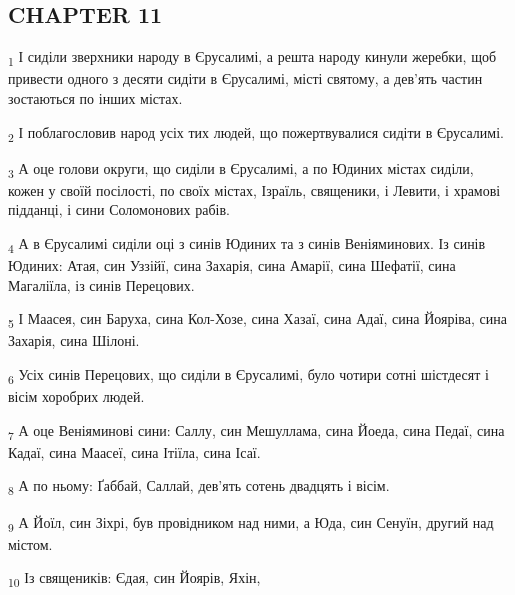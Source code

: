 \subsection{CHAPTER 11}
\begin{tcolorbox}
\textsubscript{1} І сиділи зверхники народу в Єрусалимі, а решта народу кинули жеребки, щоб привести одного з десяти сидіти в Єрусалимі, місті святому, а дев'ять частин зостаються по інших містах.
\end{tcolorbox}
\begin{tcolorbox}
\textsubscript{2} І поблагословив народ усіх тих людей, що пожертвувалися сидіти в Єрусалимі.
\end{tcolorbox}
\begin{tcolorbox}
\textsubscript{3} А оце голови округи, що сиділи в Єрусалимі, а по Юдиних містах сиділи, кожен у своїй посілості, по своїх містах, Ізраїль, священики, і Левити, і храмові підданці, і сини Соломонових рабів.
\end{tcolorbox}
\begin{tcolorbox}
\textsubscript{4} А в Єрусалимі сиділи оці з синів Юдиних та з синів Веніяминових. Із синів Юдиних: Атая, син Уззійї, сина Захарія, сина Амарії, сина Шефатії, сина Магаліїла, із синів Перецових.
\end{tcolorbox}
\begin{tcolorbox}
\textsubscript{5} І Маасея, син Баруха, сина Кол-Хозе, сина Хазаї, сина Адаї, сина Йояріва, сина Захарія, сина Шілоні.
\end{tcolorbox}
\begin{tcolorbox}
\textsubscript{6} Усіх синів Перецових, що сиділи в Єрусалимі, було чотири сотні шістдесят і вісім хоробрих людей.
\end{tcolorbox}
\begin{tcolorbox}
\textsubscript{7} А оце Веніяминові сини: Саллу, син Мешуллама, сина Йоеда, сина Педаї, сина Кадаї, сина Маасеї, сина Ітіїла, сина Ісаї.
\end{tcolorbox}
\begin{tcolorbox}
\textsubscript{8} А по ньому: Ґаббай, Саллай, дев'ять сотень двадцять і вісім.
\end{tcolorbox}
\begin{tcolorbox}
\textsubscript{9} А Йоїл, син Зіхрі, був провідником над ними, а Юда, син Сенуїн, другий над містом.
\end{tcolorbox}
\begin{tcolorbox}
\textsubscript{10} Із священиків: Єдая, син Йоярів, Яхін,
\end{tcolorbox}
